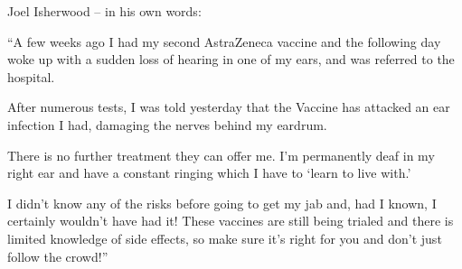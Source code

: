 Joel Isherwood – in his own words:

“A few weeks ago I had my second AstraZeneca vaccine and the following day woke
up with a sudden loss of hearing in one of my ears, and was referred to the
hospital.

After numerous tests, I was told yesterday that the Vaccine has attacked an ear
infection I had, damaging the nerves behind my eardrum.

There is no further treatment they can offer me. I’m permanently deaf in my
right ear and have a constant ringing which I have to ‘learn to live with.’

I didn’t know any of the risks before going to get my jab and, had I known, I
certainly wouldn’t have had it! These vaccines are still being trialed and there
is limited knowledge of side effects, so make sure it’s right for you and don’t
just follow the crowd!”

